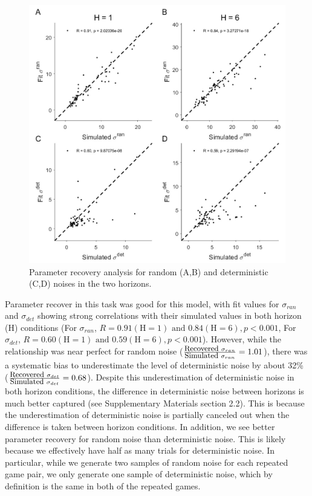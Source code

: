 \documentclass[12pt]{article}
\begin{document}
{\begin{figure}[H]
	\begin{center}
		\includegraphics[width=.95\textwidth]{figures/RDBayes_parameterrecovery_subject_examplesession_randet.jpg}
		\caption{Parameter recovery analysis for random (A,B) and deterministic (C,D) noises in the two horizons.}
		\label{fig:paramrecover_main}
	\end{center}
\end{figure}

Parameter recover in this task was good for this model, with fit values for $\sigma_{ran}$ and $\sigma_{det}$ showing strong correlations with their simulated values in both horizon (H) conditions (For $\sigma_{ran}$, $R = 0.91 (\mbox{H} = 1) \mbox{ and } 0.84 (\mbox{H} = 6), p < 0.001$, For $\sigma_{det}$, $R = 0.60 (\mbox{H} = 1) \mbox{ and } 0.59 (\mbox{H} = 6), p < 0.001$). However, while the relationship was near perfect for random noise ($\frac{\mbox{\small Recovered } \sigma_{ran}}{\mbox{\small Simulated } \sigma_{ran}} = 1.01$), there was a systematic bias to underestimate the level of deterministic noise by about 32\% ($\frac{\mbox{\small Recovered } \sigma_{det}}{\mbox{\small Simulated } \sigma_{det}} = 0.68$). Despite this underestimation of deterministic noise in both horizon conditions, the difference in deterministic noise between horizons is much better captured (see Supplementary Materials section 2.2). This is because the underestimation of deterministic noise is partially canceled out when the difference is taken between horizon conditions. In addition, we see better parameter recovery for random noise than deterministic noise. This is likely because we effectively have half as many trials for deterministic noise. In particular, while we generate two samples of random noise for each repeated game pair, we only generate one sample of deterministic noise, which by definition is the same in both of the repeated games. 
	
}
\end{document}
